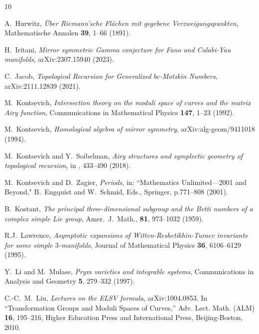 \documentclass{amsart}
\theoremstyle{definition}
\numberwithin{equation}{section}
\numberwithin{figure}{section}
\begin{document}
\begin{thebibliography}{10}
  
 









A.~Hurwitz,
\emph{\"Uber Riemann'sche Fl\"achen mit gegebene
Verzweigungspunkten},
Mathematische Annalen \textbf{39}, 1--66 (1891).



    

H.~Iritani,
\emph{Mirror symmetric Gamma conjecture for Fano and Calabi-Yau manifolds},
arXiv:2307.15940 (2023).


C.~Jacob,
\emph{Topological Recursion for Generalized $bc$-Motzkin Numbers},
arXiv:2111.12839 (2021). 


M.~Kontsevich,
\emph{Intersection theory on
the moduli space of
curves and the
matrix {Airy} function},
  Communications in Mathematical Physics
 \textbf{147}, 1--23  (1992).
 
 
M.~Kontsevich,
\emph{Homological algebra of mirror symmetry},
 arXiv:alg-geom/9411018  (1994).





M.~Kontsevich and Y.~Soibelman,
\emph{Airy structures and symplectic geometry of topological recursion},
 in 
\cite{LM}, 433--490
 (2018).

  
M.~Kontsevich and D.~Zagier,
\emph{Periods}, in: ``Mathematics Unlimited---2001 and Beyond," 
B.~Engquist and W.~Schmid, Eds., Springer,  p.771--808  (2001).



 B.~Kostant,
 \emph{The principal three-dimensional subgroup and the Betti numbers of a complex simple Lie group},
 Amer.\ J.\ Math., \textbf{81}, 973--1032 (1959).
 
R.J.~Lawrence, 
\emph{Asymptotic expansions of Witten-Reshetikhin-Turaev invariants for some
simple $3$-manifolds},
Journal of Mathematical Physics \textbf{36}, 6106--6129 (1995).
 
Y.~Li and M.~Mulase,
\emph{Prym varieties and integrable systems}, 
Communications in Analysis and Geometry \textbf{5}, 279--332 (1997).


C.-C.~M.~Liu,
\emph{Lectures on the ELSV formula},
arXiv:1004.0853. In ``Transformation Groups 
and Moduli Spaces of Curves,''
  Adv. Lect. Math. (ALM) \textbf{16}, 
  195--216,
  Higher Education Press and International Press, 
  Beijing-Boston, 2010.





\end{thebibliography}
\end{document}
